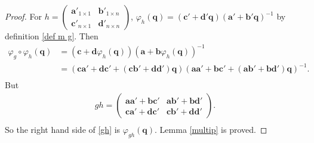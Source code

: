 \documentclass[a4paper,11pt]{amsart}
\numberwithin{equation}{section}
\begin{document}
\begin{proof}

For
$h=\begin{pmatrix} \mathbf{a}'_{1\times 1} & \mathbf{b}'_{1\times n} \\ \mathbf{c}'_{n\times 1} & \mathbf{d}'_{n\times n} \end{pmatrix}$, $\varphi_{h}(\mathbf{q})=(\mathbf{c}'+\mathbf{d}'\mathbf{q})(\mathbf{a}'+\mathbf{b}'\mathbf{q})^{-1}$ by definition \eqref{def m g}. Then
\begin{equation}\begin{aligned}\label{gh}
\varphi_{g}\circ\varphi_{h}(\mathbf{q})&=(\mathbf{c}+\mathbf{d}\varphi_{h}(\mathbf{q}))(\mathbf{a}+\mathbf{b}\varphi_{h}(\mathbf{q}))^{-1}\\
&=(\mathbf{c}\mathbf{a}'+\mathbf{d}\mathbf{c}'+(\mathbf{c}\mathbf{b}'+\mathbf{d}\mathbf{d}')\mathbf{q})(\mathbf{a}\mathbf{a}'+\mathbf{b}\mathbf{c}'+(\mathbf{a}\mathbf{b}'+\mathbf{b}\mathbf{d}')\mathbf{q})^{-1}.\\
\end{aligned}\end{equation}
But
\begin{equation*}\begin{aligned}
gh=\begin{pmatrix} \mathbf{a}\mathbf{a}'+\mathbf{b}\mathbf{c}' & \mathbf{a}\mathbf{b}'+\mathbf{b}\mathbf{d}' \\ \mathbf{c}\mathbf{a}'+\mathbf{d}\mathbf{c}'& \mathbf{c}\mathbf{b}'+\mathbf{d}\mathbf{d}' \end{pmatrix}
.\\
\end{aligned}\end{equation*}
So the right hand side of \eqref{gh} is $\varphi_{gh}(\mathbf{q})$. Lemma \ref{multip} is proved.
\end{proof}
\end{document}
